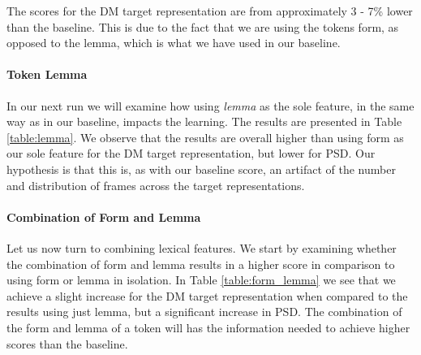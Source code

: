 The scores for the DM target representation are from approximately 3 - 7\% lower than the baseline. This is due to the fact that we are using the tokens form, as opposed to the lemma, which is what we have used in our baseline.

\paragraph{Token Lemma} In our next run we will examine how using \textit{lemma} as the sole feature, in the same way as in our baseline, impacts the learning. The results are presented in Table \ref{table:lemma}. We observe that the results are overall higher than using form as our sole feature for the DM target representation, but lower for PSD. Our hypothesis is that this is, as with our baseline score, an artifact of the number and distribution of frames across the target representations. 


\paragraph{Combination of Form and Lemma} Let us now turn to combining lexical features. We start by examining whether the combination of form and lemma results in a higher score in comparison to using form or lemma in isolation. In Table \ref{table:form_lemma} we see that we achieve a slight increase for the DM target representation when compared to the results using just lemma, but a significant increase in PSD. The combination of the form and lemma of a token will has the information needed to achieve higher scores than the baseline.

